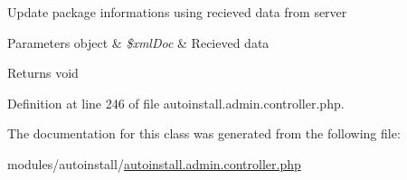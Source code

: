 Update package informations using recieved data from server


\begin{DoxyParams}[1]{Parameters}
object & {\em \$xml\+Doc} & Recieved data \\
\hline
\end{DoxyParams}
\begin{DoxyReturn}{Returns}
void 
\end{DoxyReturn}


Definition at line 246 of file autoinstall.\+admin.\+controller.\+php.



The documentation for this class was generated from the following file\+:\begin{DoxyCompactItemize}
\item 
modules/autoinstall/\hyperlink{autoinstall_8admin_8controller_8php}{autoinstall.\+admin.\+controller.\+php}\end{DoxyCompactItemize}

